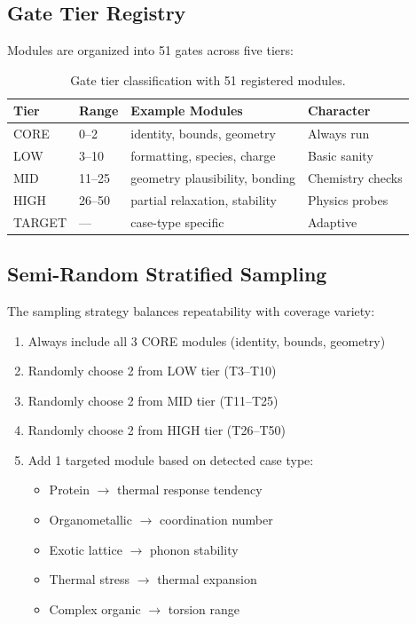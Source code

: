 \documentclass[11pt,a4paper]{article}
\begin{document}
\subsection{Gate Tier Registry}

Modules are organized into 51 gates across five tiers:

\begin{table}[h]
\centering
\begin{tabular}{llll}
\toprule
\textbf{Tier} & \textbf{Range} & \textbf{Example Modules} & \textbf{Character} \\
\midrule
CORE   & 0--2   & identity, bounds, geometry       & Always run \\
LOW    & 3--10  & formatting, species, charge       & Basic sanity \\
MID    & 11--25 & geometry plausibility, bonding    & Chemistry checks \\
HIGH   & 26--50 & partial relaxation, stability     & Physics probes \\
TARGET & ---    & case-type specific                & Adaptive \\
\bottomrule
\end{tabular}
\caption{Gate tier classification with 51 registered modules.}
\end{table}

\subsection{Semi-Random Stratified Sampling}

The sampling strategy balances repeatability with coverage variety:

\begin{enumerate}
  \item Always include all 3 CORE modules (identity, bounds, geometry)
  \item Randomly choose 2 from LOW tier (T3--T10)
  \item Randomly choose 2 from MID tier (T11--T25)
  \item Randomly choose 2 from HIGH tier (T26--T50)
  \item Add 1 targeted module based on detected case type:
    \begin{itemize}
      \item Protein $\rightarrow$ thermal response tendency
      \item Organometallic $\rightarrow$ coordination number
      \item Exotic lattice $\rightarrow$ phonon stability
      \item Thermal stress $\rightarrow$ thermal expansion
      \item Complex organic $\rightarrow$ torsion range
    \end{itemize}
\end{enumerate}
\end{document}
